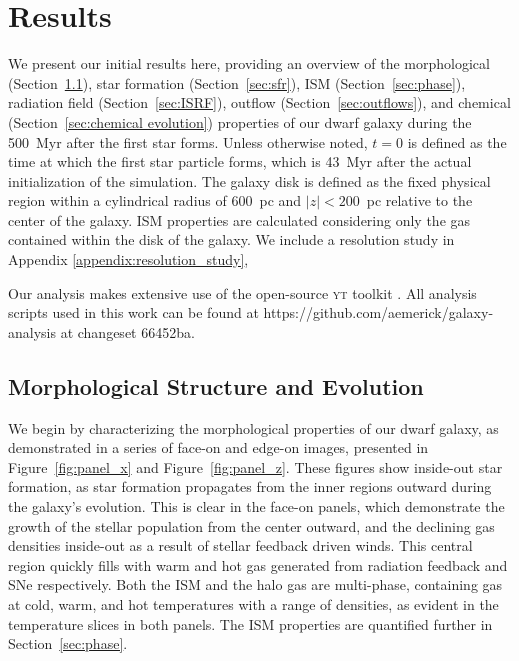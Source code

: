 \documentclass[twocolumn]{aastex61}
\begin{document}
\section{Results}
\label{sec:results}
We present our initial results here, providing an overview of the morphological (Section~\ref{sec:structure}), star formation (Section~\ref{sec:sfr}), ISM (Section~\ref{sec:phase}), radiation field (Section~\ref{sec:ISRF}), outflow (Section~\ref{sec:outflows}), and chemical (Section~\ref{sec:chemical evolution}) properties of our dwarf galaxy during the 500~Myr after the first star forms. Unless otherwise noted, $t = 0$ is defined as the time at which the first star particle forms, which is 43~Myr after the actual initialization of the simulation. The galaxy disk is defined as the fixed physical region within a cylindrical radius of 600~pc and $|z| < 200$~pc relative to the center of the galaxy. ISM properties are calculated considering only the gas contained within the disk of the galaxy. We include a resolution study in Appendix \ref{appendix:resolution_study},

Our analysis makes extensive use of the open-source \textsc{yt} toolkit \citep{yt}. All analysis scripts used in this work can be found at https://github.com/aemerick/galaxy-analysis at changeset 66452ba.

\subsection{Morphological Structure and Evolution}
\label{sec:structure}

We begin by characterizing the morphological properties of our dwarf galaxy, as demonstrated in a series of face-on and edge-on images, presented in Figure~\ref{fig:panel_x} and Figure~\ref{fig:panel_z}. These figures show inside-out star formation, as star formation propagates from the inner regions outward during the galaxy's evolution. This is clear in the face-on panels, which demonstrate the growth of the stellar population from the center outward, and the declining gas densities inside-out as a result of stellar feedback driven winds.    This central region quickly fills with warm and hot gas generated from radiation feedback and SNe respectively. Both the ISM and the halo gas are multi-phase, containing gas at cold, warm, and hot temperatures with a range of densities, as evident in the temperature slices in both panels. The ISM properties are quantified further in Section~\ref{sec:phase}.
\end{document}
